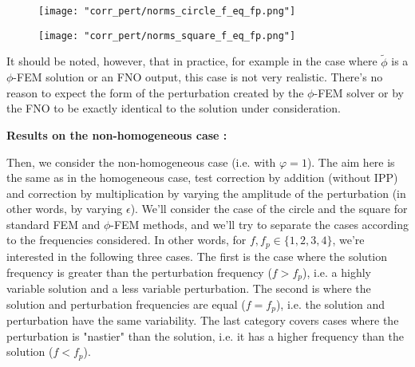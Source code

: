 \begin{itemize}
	\begin{minipage}{0.48\linewidth}
		\begin{figure}[H]
			\centering
			\texttt{[image: "corr\_pert/norms\_circle\_f\_eq\_fp.png"]}
			\label{norms_circle_f_eq_fp}
		\end{figure} 
	\end{minipage}
	\begin{minipage}{0.48\linewidth}
		\begin{figure}[H]
			\centering
			\texttt{[image: "corr\_pert/norms\_square\_f\_eq\_fp.png"]}
			\label{norms_square_f_eq_fp}
		\end{figure} 
	\end{minipage}
	\begin{Rem}
		It should be noted, however, that in practice, for example in the case where $\tilde{\phi}$ is a $\phi$-FEM solution or an FNO output, this case is not very realistic. There's no reason to expect the form of the perturbation created by the $\phi$-FEM solver or by the FNO to be exactly identical to the solution under consideration.
	\end{Rem}
\end{itemize}

\textbf{Results on the non-homogeneous case :}

Then, we consider the non-homogeneous case (i.e. with $\varphi=1$). The aim here is the same as in the homogeneous case, test correction by addition (without IPP) and correction by multiplication by varying the amplitude of the perturbation (in other words, by varying $\epsilon$). We'll consider the case of the circle and the square for standard FEM and $\phi$-FEM methods, and we'll try to separate the cases according to the frequencies considered. In other words, for $f,f_p\in\{1,2,3,4\}$, we're interested in the following three cases. The first is the case where the solution frequency is greater than the perturbation frequency ($f>f_p$), i.e. a highly variable solution and a less variable perturbation. The second is where the solution and perturbation frequencies are equal ($f=f_p$), i.e. the solution and perturbation have the same variability. The last category covers cases where the perturbation is "nastier" than the solution, i.e. it has a higher frequency than the solution ($f<f_p$).

